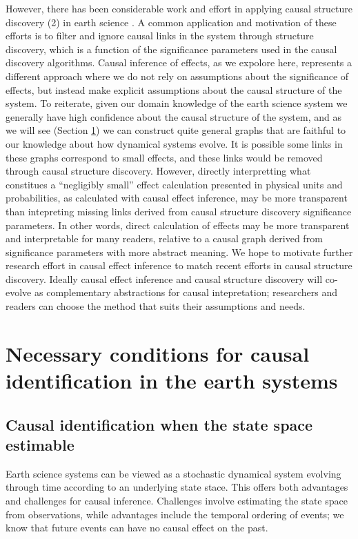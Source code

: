 \documentclass[12pt]{article}
\begin{document}
However, there has been considerable work and effort in applying
causal structure discovery (2) in earth science
\citep[e.g.,][]{ebert-uphoff2012,
  samarasinghe-casuality,runge-causal-timeseries,runge2019inferring}. A
common application and motivation of these efforts is to filter and
ignore causal links in the system through structure discovery, which
is a function of the significance parameters used in the causal
discovery algorithms. Causal inference of effects, as we expolore
here, represents a different approach where we do not rely on
assumptions about the significance of effects, but instead make
explicit assumptions about the causal structure of the system. To
reiterate, given our domain knowledge of the earth science system we
generally have high confidence about the causal structure of the
system, and as we will see (Section \ref{sec:necess-cond-caus}) we can
construct quite general graphs that are faithful to our knowledge
about how dynamical systems evolve. It is possible some links in these
graphs correspond to small effects, and these links would be removed
through causal structure discovery. However, directly interpretting
what constitues a ``negligibly small'' effect calculation presented in
physical units and probabilities, as calculated with causal effect
inference, may be more transparent than intepreting missing links
derived from causal structure discovery significance parameters. In
other words, direct calculation of effects may be more transparent and
interpretable for many readers, relative to a causal graph derived
from significance parameters with more abstract meaning. We hope to
motivate further research effort in causal effect inference to match
recent efforts in causal structure discovery. Ideally causal effect
inference and causal structure discovery will co-evolve as
complementary abstractions for causal intepretation; researchers and
readers can choose the method that suits their assumptions and needs.

\section{Necessary conditions for causal identification in the earth
  systems}
\label{sec:necess-cond-caus}
\subsection{Causal identification when the state space estimable}
\label{state-space}

Earth science systems can be viewed as a stochastic dynamical system
evolving through time according to an underlying state stace. This
offers both advantages and challenges for causal inference. Challenges
involve estimating the state space from observations, while advantages
include the temporal ordering of events; we know that future events
can have no causal effect on the past.
\end{document}
